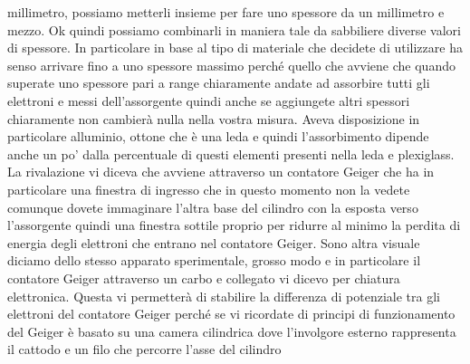 millimetro, possiamo metterli insieme per fare uno spessore da un millimetro e mezzo. Ok quindi possiamo combinarli in maniera tale da sabbiliere diverse valori di spessore. In particolare in base al tipo di materiale che decidete di utilizzare ha senso arrivare fino a uno spessore massimo perché quello che avviene che quando superate uno spessore pari a range chiaramente andate ad assorbire tutti gli elettroni e messi dell'assorgente quindi anche se aggiungete altri spessori chiaramente non cambierà nulla nella vostra misura. Aveva disposizione in particolare alluminio, ottone che è una leda e quindi l'assorbimento dipende anche un po' dalla percentuale di questi elementi presenti nella leda e plexiglass. La rivalazione vi diceva che avviene attraverso un contatore Geiger che ha in particolare una finestra di ingresso che in questo momento non la vedete comunque dovete immaginare l'altra base del cilindro con la esposta verso l'assorgente quindi una finestra sottile proprio per ridurre al minimo la perdita di energia degli elettroni che entrano nel contatore Geiger. Sono altra visuale diciamo dello stesso apparato sperimentale, grosso modo e in particolare il contatore Geiger attraverso un carbo e collegato vi dicevo per chiatura elettronica. Questa vi permetterà di stabilire la differenza di potenziale tra gli elettroni del contatore Geiger perché se vi ricordate di principi di funzionamento del Geiger è basato su una camera cilindrica dove l'involgore esterno rappresenta il cattodo e un filo che percorre l'asse del cilindro 

